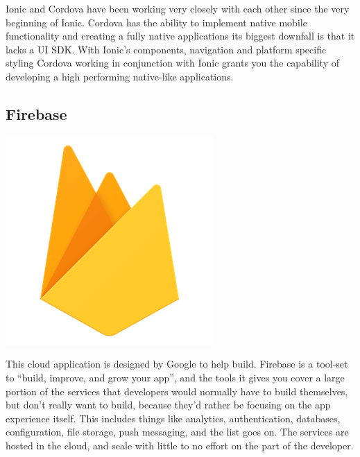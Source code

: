 \documentclass[a4paper,12pt,twoside]{report}
\begin{document}
Ionic and Cordova have been working very closely with each other since the very beginning of Ionic. Cordova has the ability to implement native mobile functionality and creating a fully native applications its biggest downfall is that it lacks a UI SDK.
With Ionic's components, navigation and platform specific styling Cordova working in conjunction with Ionic grants you the capability of developing a high performing native-like applications.\cite{cordovaInsight}

\subsection{Firebase} 
\includegraphics[scale=.05]{images/firebase.png}

This cloud application is designed by Google to help build. Firebase is a tool-set to “build, improve, and grow your app”, and the tools it gives you cover a large portion of the services that developers would normally have to build themselves, but don’t really want to build, because they’d rather be focusing on the app experience itself. This includes things like analytics, authentication, databases, configuration, file storage, push messaging, and the list goes on. The services are hosted in the cloud, and scale with little to no effort on the part of the developer.
\end{document}
